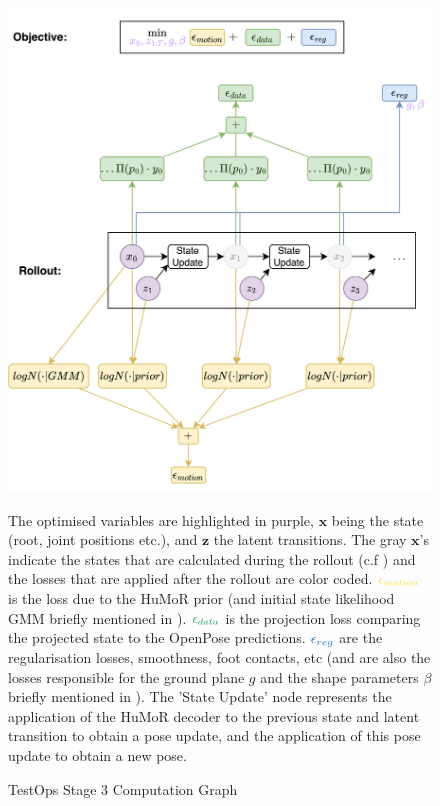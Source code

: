 \begin{figure}
    \centering
    \includegraphics[width=1\textwidth]{Figures/humor/improvement/computation_graph_humor.png}
    \caption{TestOps Stage 3 Computation Graph}
    \label{fig:humor_rollout_graph}
    \medskip
    \small
    \raggedright
    The optimised variables are highlighted in purple, $\mathbf{x}$ being the state (root, joint positions etc.), and $\mathbf{z}$ the latent transitions. The gray $\mathbf{x}$'s indicate the states that are calculated during the rollout (c.f ) and the losses that are applied after the rollout are color coded. $\textcolor{Goldenrod}{\epsilon_{motion}}$ is the loss due to the HuMoR prior (and initial state likelihood GMM briefly mentioned in ). $\textcolor{ForestGreen}{\epsilon_{data}}$ is the projection loss comparing the projected state to the OpenPose predictions. $\textcolor{RoyalBlue}{\epsilon_{reg}}$ are the regularisation losses, smoothness, foot contacts, etc (and are also the losses responsible for the ground plane $g$ and the shape parameters $\beta$ briefly mentioned in ). The 'State Update' node represents the application of the HuMoR decoder to the previous state and latent transition to obtain a pose update, and the application of this pose update to obtain a new pose.
\end{figure}

